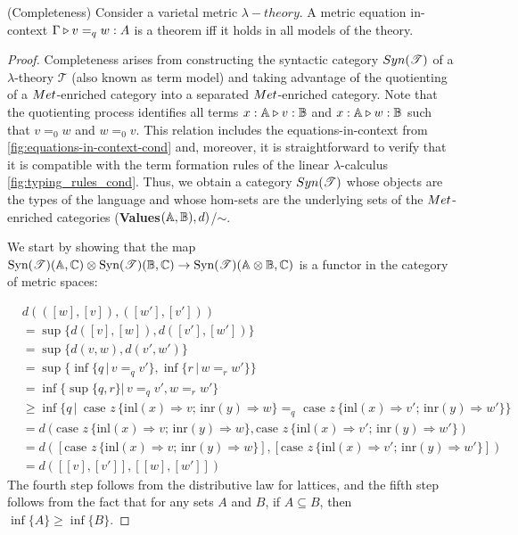 \documentclass[a4paper,UKenglish,cleveref, autoref, thm-restate]{lipics-v2021}
\begin{document}
\begin{theorem} (Completeness)
  Consider a varietal metric $\lambda-theory$. A metric equation
in-context $\Gamma \triangleright v =_q w : A$ is a theorem iff it holds in all models of the theory.
\end{theorem}
\begin{proof}


  Completeness arises from constructing the syntactic category $\catSyn(\mathscr{T})$ of a $\lambda$-theory $\mathscr{T}$ (also known as term model)  and taking advantage of the quotienting of a  $\catMet$-enriched category into a separated  $\catMet$-enriched category. Note that the quotienting process identifies all terms $x : \mathbb{A} \triangleright v : \mathbb{B}$ and $x : \mathbb{A} \triangleright w : \mathbb{B}$ such that $v =_0 w$ and $w =_0 v$. This relation includes the equations-in-context from \autoref{fig:equations-in-context-cond} and, moreover, it is straightforward to verify that it is compatible with the term formation rules of the linear $\lambda$-calculus \autoref{fig:typing_rules_cond}. Thus, we obtain a category $\catSyn(\mathscr{T})$ whose objects are the types of the language and whose hom-sets are the underlying sets of the  $\catMet$-enriched categories (\textbf{Values}$(\mathbb{A},\mathbb{B}),d)$/$\sim$.

  We start by showing that the map $\text{Syn}(\mathscr{T})(\mathbb{A},\mathbb{C}) \otimes \text{Syn}(\mathscr{T})(\mathbb{B},\mathbb{C}) \rightarrow
  \text{Syn}(\mathscr{T})(\mathbb{A} \otimes \mathbb{B} ,\mathbb{C})$ is a functor in the category of metric spaces:

  \begin{align*}
    & d(([w], [v]), ([w'], [v']))  \\
    & = \sup{\{d([v],[w]),d([v'],[w']) \}}  \\
    & = \sup{\{d(v,w),d(v',w') \}} \\
    & = \sup {\{ \inf{\{q \, \vert \, v=_q v'\}},\inf{\{r \, \vert \, w=_r w'\}}  \}} \\
    & = \inf{\{ \sup \{ q, r \} \vert \, v=_q v', w=_r w' \}} &  \\
    & \geq  \inf{ \{ q  \,\vert \, \text{ case } z \,   \{\text{inl} (x) \Rightarrow v ; \, \text{inr} (y) \Rightarrow w\} =_{q} \text{ case } z \,  \{\text{inl} (x) \Rightarrow v' ; \,\text{inr} (y) \Rightarrow w'\} \} } &  \\ 
    & = d(\text{case } z \,   \{\text{inl} (x) \Rightarrow v ; \, \text{inr} (y) \Rightarrow w\}, \text{case } z \,  \{\text{inl} (x) \Rightarrow v' ; \,\text{inr} (y) \Rightarrow w'\}) \\
    & = d([\text{case } z \,   \{\text{inl} (x) \Rightarrow v ; \, \text{inr} (y) \Rightarrow w\}], [\text{case } z \,  \{\text{inl} (x) \Rightarrow v' ; \,\text{inr} (y) \Rightarrow w'\}]) \\
    & = d([[v],[v']],[[w],[w']])  
  \end{align*}
   The fourth step follows from the distributive law for lattices, and the fifth step follows from the fact that for any sets $A$ and $B$, if $A \subseteq B$, then $\inf\{A\} \geq \inf\{B\}$.


\end{proof}
\end{document}
